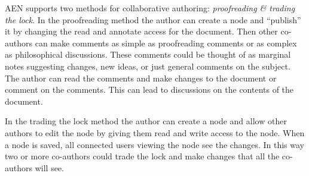 AEN supports two methods for collaborative authoring: {\em proofreading \&
trading the lock}.  In the proofreading method the author can create a node
and ``publish'' it by changing the read and annotate access for the
document.  Then other co-authors can make comments as simple as
proofreading comments or as complex as philosophical discussions.  These
comments could be thought of as marginal notes suggesting changes, new
ideas, or just general comments on the subject.  The author can read the
comments and make changes to the document or comment on the comments.  This
can lead to discussions on the contents of the document.

In the trading the lock method the author can create a node and
allow other authors to edit the node by giving them read and write access to the
node.  When a node is saved, all connected users viewing the node
see the changes.  In this way two or more co-authors could trade the lock and
make changes that all the co-authors will see.  

